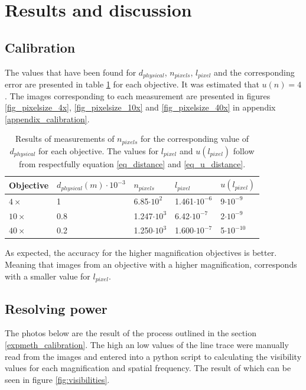 \section{Results and discussion}
\subsection{Calibration}

The values that have been found for $d_{physical}$, $n_{pixels}$, $l_{pixel}$ and the corresponding error are presented in table \ref{table_pixelsize} for each objective. It was estimated that $u(n) = 4$. The images corresponding to each measurement are presented in figures \ref{fig_pixelsize_4x}, \ref{fig_pixelsize_10x} and \ref{fig_pixelsize_40x} in appendix \ref{appendix_calibration}.

\begin{table}[h!]
\centering
\captionsetup{font=small, justification = centering}
  \caption{Results of measurements of $n_{pixels}$ for the corresponding value of $d_{physical}$ for each objective. The values for $l_{pixel}$ and $u(l_{pixel})$ follow from respectfully equation \ref{eq_distance} and \ref{eq_u_distance}.}
\begin{tabular}{|l|l|l|l|l|}
\hline

Objective & $d_{physical} (m) \cdot 10^{-3}$ & $n_{pixels}$ & $l_{pixel}$ & $u(l_{pixel})$ \\ \hline
$4\times$ & 1 & 6.85$\cdot 10^2$ & 1.461$\cdot 10^{-6}$ & 9$\cdot 10^{-9}$\\
$10\times$ & 0.8 & 1.247$\cdot 10^3$ & 6.42$\cdot 10^{-7}$ & 2$\cdot 10^{-9}$ \\
$40\times$ & 0.2 & 1.250$\cdot 10^3$ & 1.600$\cdot 10^{-7}$ & 5$\cdot 10^{-10}$ \\ \hline
\end{tabular}

\label{table_pixelsize}
\end{table}
As expected, the accuracy for the higher magnification objectives is better. Meaning that images from an objective with a higher magnification, corresponds with a smaller value for $l_{pixel}$.\\

\subsection{Resolving power}

The photos below are the result of the process outlined in the section \ref{expmeth_calibration}. The high an low values of the line trace were manually read from the images and entered into a python script to calculating the visibility values for each magnification and spatial frequency. The result of which can be seen in figure \ref{fig:visibilities}.\\

